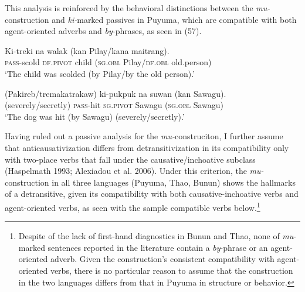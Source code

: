 \documentclass[10pt]{article}
\begin{document}
This analysis is reinforced by the behavioral distinctions between the \textit{mu-}construction and \textit{ki-}marked passives in Puyuma, which are compatible with both agent-oriented adverbs and \textit{by-}phrases, as seen in (57).


\begin{exe}
    \begin{xlist}
		\ex
		\gll Ki-treki na walak (\textsuperscript{\Checkmark}\hspace{-1mm}kan Pilay/kana maitrang). \\
           \textsc{pass}-scold \textsc{df.pivot} child (\textsc{sg.obl} Pilay/\textsc{df.obl} old.person) \\
            \trans `The child was scolded (by Pilay/by the old person).'
             
	\ex
		\gll (\textsuperscript{\Checkmark}\hspace{-1mm}Pakireb/tremakatrakaw) ki-pukpuk na suwan (\textsuperscript{\Checkmark}\hspace{-1mm}kan Sawagu). \\
            (severely/secretly) \textsc{pass}-hit \textsc{sg.pivot} Sawagu (\textsc{sg.obl} Sawagu)  \\
            \trans `The dog was hit (by Sawagu) (severely/secretly).'
            
            \end{xlist}
            \end{exe}



Having ruled out a passive analysis for the \textit{mu-}construciton, I further assume that anticausativization differs from detransitivization in its compatibility only with two-place verbs that fall under the causative/inchoative subclass (Haspelmath 1993; Alexiadou et al. 2006). Under this criterion, the \textit{mu-}construction in all three languages (Puyuma, Thao, Bunun) shows the hallmarks of a detransitive, given its compatibility with both causative-inchoative verbs and agent-oriented verbs, as seen with the sample compatible verbs below.\footnote{Despite of the lack of first-hand diagnostics in Bunun and Thao, none of \textit{mu}-marked sentences reported in the literature contain a \textit{by}-phrase or an agent-oriented adverb. Given the construction's consistent compatibility with agent-oriented verbs, there is no particular reason to assume that the construction in the two languages differs from that in Puyuma in structure or behavior.} 
\end{document}
